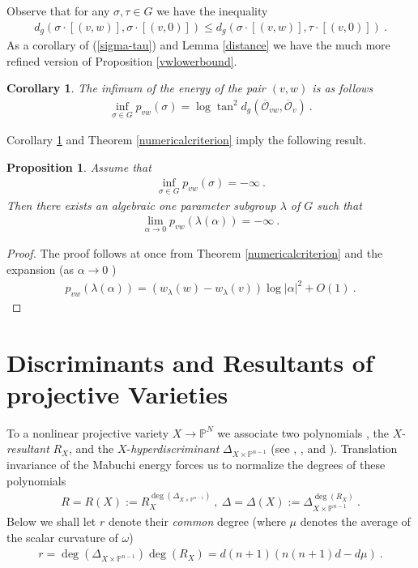 \documentclass[12pt]{amsart}
\newtheorem{proposition}{Proposition}
\newtheorem{corollary}{Corollary}
\numberwithin{equation}{section}
\numberwithin{remark}{section}
\numberwithin{theorem}{section}
\numberwithin{proposition}{section}
\numberwithin{definition}{section}
\numberwithin{lemma}{section}
\numberwithin{claim}{section}
\numberwithin{corollary}{section}
\numberwithin{conjecture}{section}
\begin{document}
Observe that for any $\sigma,\tau \in G$ we have the inequality
\begin{align}\label{sigma-tau}
d_g(\sigma\cdot [(v,w)] , \sigma\cdot [(v,0)])\leq d_g(\sigma\cdot [(v,w)] , \tau\cdot [(v,0)])\ .
\end{align}
 As a corollary of (\ref{sigma-tau}) and Lemma \ref{distance} we have the much more refined version of Proposition \ref{vwlowerbound}.
\begin{corollary}\label{infi}\emph{ The infimum of the energy of the pair $(v,w)$ is as follows}
 \begin{align}\label{inf}
 \inf_{\sigma\in G}p_{vw}(\sigma)=\log\tan^2d_g(\overline{\mathcal{O}}_{vw},\overline{\mathcal{O}}_{v}) \ .  
 \end{align}  
 \end{corollary}
 Corollary \ref{infi} and Theorem \ref{numericalcriterion}  imply the following result.
 \begin{proposition}\label{energyasymp}
\emph{Assume that
\begin{align}
\inf_{\sigma\in G}p_{vw}(\sigma)=-\infty \ .
\end{align}
Then there exists an algebraic one parameter subgroup $\lambda$ of $G$ such that}
\begin{align}
\lim_{\alpha{\ensuremath{\longrightarrow}} 0}p_{vw}( {\lambda(\alpha)})= -\infty  \ .
\end{align}
\end{proposition}
\begin{proof}
The proof follows at once from Theorem \ref{numericalcriterion} and the expansion (as $\alpha{\ensuremath{\longrightarrow}} 0$ )
\begin{align}
p_{vw}(\lambda(\alpha))=(w_{\lambda}(w)-w_{\lambda}(v))\log|\alpha|^2+O(1)\ .
\end{align}  
 \end{proof}
\section{Discriminants and Resultants of projective Varieties}
To a nonlinear projective variety $X{\ensuremath{\longrightarrow}}{\ensuremath{\mathbb{P}^{N}}}$ we associate two polynomials , the $X$-\emph{resultant}  $R_X$,  and the $X$-\emph{hyperdiscriminant} $\Delta_{\ensuremath{X\times\mathbb{P}^{n-1}}}$ (see \cite{gkz}, \cite{paul2011}, and \cite{paulcm2012}).
 Translation invariance of the Mabuchi energy forces us to {normalize the degrees} of  these polynomials  
\begin{align} 
 R=R(X):= R^{\deg(\Delta_{\ensuremath{X\times\mathbb{P}^{n-1}}})}_{X} \ ,\ \Delta=\Delta(X):=\Delta ^{\deg(R_X)}_{\ensuremath{X\times\mathbb{P}^{n-1}}} \ .
  \end{align}
 Below we shall let $r$ denote their \emph{common} degree (where $\mu$ denotes the average of the scalar curvature of ${\ensuremath{\omega}}$) 
 \begin{align}
 r=\deg(\Delta_{\ensuremath{X\times\mathbb{P}^{n-1}}})\deg(R_X)=d(n+1)(n(n+1)d-d\mu) \ .
 \end{align}
 
\end{document}
